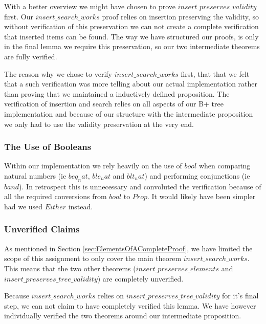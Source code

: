 With a better overview we might have chosen to prove $insert\_preserves\_validity$ first. Our $insert\_search\_works$ proof relies on insertion preserving the validity, so without verification of this preservation we can not create a complete verification that inserted items can be found. The way we have structured our proofs, is only in the final lemma we require this preservation, so our two intermediate theorems are fully verified.

The reason why we chose to verify $insert\_search\_works$ first, that that we felt that a such verification was more telling about our actual implementation rather than proving that we maintained a inductively defined proposition. The verification of insertion and search relies on all aspects of our B+ tree implementation and because of our structure with the intermediate proposition we only had to use the validity preservation at the very end.

\subsubsection{The Use of Booleans}

Within our implementation we rely heavily on the use of $bool$ when comparing natural numbers (ie $beq_nat$, $ble_nat$ and $blt_nat$) and performing conjunctions (ie $band$). In retrospect this is unnecessary and convoluted the verification because of all the required conversions from $bool$ to $Prop$. It would likely have been simpler had we used $Either$ instead.

\subsubsection{Unverified Claims}

As mentioned in Section \ref{sec:ElementsOfACompleteProof}, we have limited the scope of this assignment to only cover the main theorem $insert\_search\_works$. This means that the two other theorems ($insert\_preserves\_elements$ and $insert\_preserves\_tree\_validity$) are completely unverified.

Because $insert\_search\_works$ relies on $insert\_preserves\_tree\_validity$ for it's final step, we can not claim to have completely verified this lemma. We have however individually verified the two theorems around our intermediate proposition.
